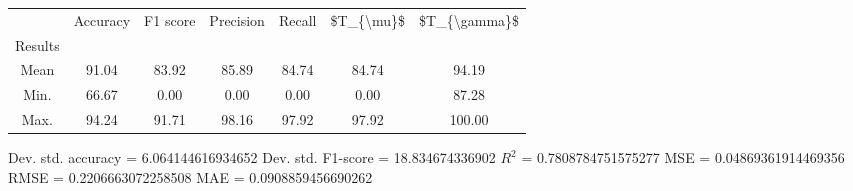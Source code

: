 \begin{tabular}{|c|c|c|c|c|c|c|}
\toprule
{} &  Accuracy &  F1 score &  Precision &  Recall &  \$T\_\{\textbackslash mu\}\$ &  \$T\_\{\textbackslash gamma\}\$ \\
Results &           &           &            &         &            &               \\
\hline
Mean    &     91.04 &     83.92 &      85.89 &   84.74 &      84.74 &         94.19 \\
Min.    &     66.67 &      0.00 &       0.00 &    0.00 &       0.00 &         87.28 \\
Max.    &     94.24 &     91.71 &      98.16 &   97.92 &      97.92 &        100.00 \\
\bottomrule
\end{tabular}

 Dev. std. accuracy = 6.064144616934652
 Dev. std. F1-score = 18.834674336902
 $R^2$ = 0.7808784751575277
 MSE = 0.04869361914469356
 RMSE = 0.2206663072258508
 MAE = 0.0908859456690262